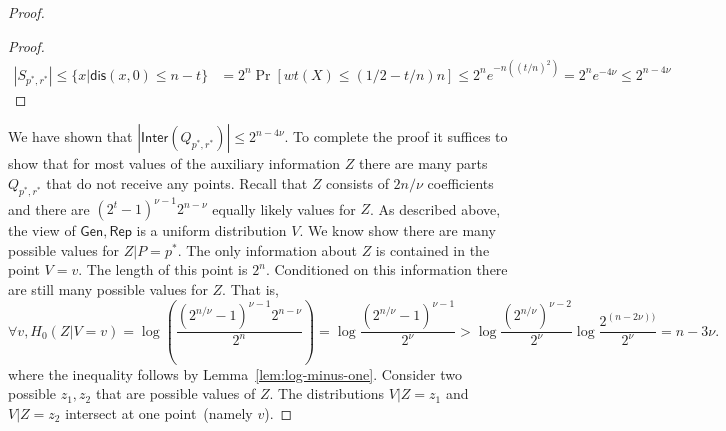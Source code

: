 \documentclass[11pt]{article}
\newcommand{\lemref}[1]{\mbox{Lemma~\ref{#1}}}
\newcommand{\class}[1]{{\ensuremath{\mathsf{#1}}}}
\newcommand{\gen}{\ensuremath{\class{Gen}}\xspace}
\newcommand{\rep}{\ensuremath{\class{Rep}}\xspace}
\newcommand{\inter}{\ensuremath{\class{Inter}}\xspace}
\newcommand{\dis}{\ensuremath{\mathsf{dis}}}
\newcommand{\authnote}[2]{{\textcolor{red}{\textsf{#1 notes: }\textcolor{blue}{ #2}}\marginpar{\textcolor{red}{\textbf{!!!!!}}}}}
\newcommand{\authnote}[2]{}
\newcommand{\bnote}[1]{{\authnote{Ben}{#1}}}
\begin{document}
\begin{proof}
\begin{proof}
\begin{align*}
|S_{p^*, r^*}| \le \{ x | \dis (x, 0)\le n-t\} &= 2^n \Pr[ wt(X) \le (1/2-t/n)n] \le 2^n e^{-n ((t/n)^2)} = 2^n e^{-4\nu} \le 2^{n - 4\nu}
\end{align*}
%
\end{proof}

We have shown that $|\inter(Q_{p^*, r^*})| \le 2^{n-4\nu}$.  %
To complete the proof it suffices to show that for most values of the auxiliary information $Z$ there are many parts $Q_{p^*, r^*}$ that do not receive any points.  
Recall that $Z$ consists of $2n/\nu$ coefficients and there are $(2^t-1)^{\nu-1} 2^{n-\nu}$ equally likely values for $Z$.
 As described above, the view of $\gen, \rep$ is a uniform distribution $V$.  We know show there are many possible values for $Z |P=p^*$.  The only information about $Z$ is contained in the point  $V=v$.  The length of this point is $2^n$.  Conditioned on this information there are still many possible values for $Z$.  That is, 
 \[
 \forall v, H_0(Z | V=v) =\log \left(\frac{(2^{n/\nu}-1)^{\nu-1} 2^{n-\nu}}{2^n} \right) = \log \frac{(2^{n/\nu}-1)^{\nu-1}}{2^{\nu}} >\log  \frac{(2^{n/\nu})^{\nu-2}}{2^{\nu}}  \log \frac{2^{(n-2\nu))}}{2^\nu} = n -3\nu.
 \]
 where the inequality follows by \lemref{lem:log-minus-one}.
Consider two possible $z_1, z_2$ that are possible values of $Z$.  The distributions $V| Z=z_1$ and $V | Z=z_2$ intersect at one point~(namely $v$).  


\end{proof}
\end{document}
